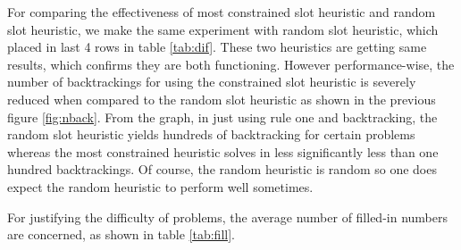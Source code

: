 \begin{table}[!h]
    \centering
    \caption{Number of complete problems in different combinations of rules. The default heuristic is the most constrained slot. Picking the most constrained slot or picking random slot is the same. Here, r1: rule 1, r1,2: rule1 + rule2, n2: naked double, n3: naked triple, n2,3: n2 + n3.}\label{tab:dif}
\end{table}

For comparing the effectiveness of most constrained slot heuristic and random slot heuristic, we make the same experiment with random slot heuristic, which placed in last 4 rows in table \ref{tab:dif}. These two heuristics are getting same results, which confirms they are both functioning. However performance-wise, the number of backtrackings for using the constrained slot heuristic is severely reduced when compared to the random slot heuristic as shown in the previous figure \ref{fig:nback}. From the graph, in just using rule one and backtracking, the random slot heuristic yields hundreds of backtracking for certain problems whereas the most constrained heuristic solves in less significantly less than one hundred backtrackings. Of course, the random heuristic is random so one does expect the random heuristic to perform well sometimes.

For justifying the difficulty of problems, the average number of filled-in numbers are concerned, as shown in table \ref{tab:fill}.

